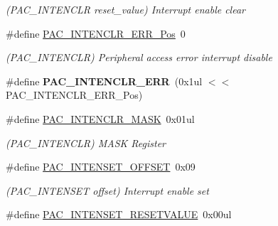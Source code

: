\begin{DoxyCompactItemize}
\begin{DoxyCompactList}\small\item\em (P\+A\+C\+\_\+\+I\+N\+T\+E\+N\+C\+L\+R reset\+\_\+value) Interrupt enable clear \end{DoxyCompactList}\item 
\hypertarget{group___s_a_m_l21___p_a_c_ga9d91633dd3124f58a42f16cbdf9bda28}{}\#define \hyperlink{group___s_a_m_l21___p_a_c_ga9d91633dd3124f58a42f16cbdf9bda28}{P\+A\+C\+\_\+\+I\+N\+T\+E\+N\+C\+L\+R\+\_\+\+E\+R\+R\+\_\+\+Pos}~0\label{group___s_a_m_l21___p_a_c_ga9d91633dd3124f58a42f16cbdf9bda28}

\begin{DoxyCompactList}\small\item\em (P\+A\+C\+\_\+\+I\+N\+T\+E\+N\+C\+L\+R) Peripheral access error interrupt disable \end{DoxyCompactList}\item 
\hypertarget{group___s_a_m_l21___p_a_c_ga0e138b449b32b5129e678be1f0547561}{}\#define {\bfseries P\+A\+C\+\_\+\+I\+N\+T\+E\+N\+C\+L\+R\+\_\+\+E\+R\+R}~(0x1ul $<$$<$ P\+A\+C\+\_\+\+I\+N\+T\+E\+N\+C\+L\+R\+\_\+\+E\+R\+R\+\_\+\+Pos)\label{group___s_a_m_l21___p_a_c_ga0e138b449b32b5129e678be1f0547561}

\item 
\hypertarget{group___s_a_m_l21___p_a_c_ga5d611adf6f1cc6376f50b18834e49b61}{}\#define \hyperlink{group___s_a_m_l21___p_a_c_ga5d611adf6f1cc6376f50b18834e49b61}{P\+A\+C\+\_\+\+I\+N\+T\+E\+N\+C\+L\+R\+\_\+\+M\+A\+S\+K}~0x01ul\label{group___s_a_m_l21___p_a_c_ga5d611adf6f1cc6376f50b18834e49b61}

\begin{DoxyCompactList}\small\item\em (P\+A\+C\+\_\+\+I\+N\+T\+E\+N\+C\+L\+R) M\+A\+S\+K Register \end{DoxyCompactList}\item 
\hypertarget{group___s_a_m_l21___p_a_c_ga421fbc8df3566dfcce8a684c5ae89aaa}{}\#define \hyperlink{group___s_a_m_l21___p_a_c_ga421fbc8df3566dfcce8a684c5ae89aaa}{P\+A\+C\+\_\+\+I\+N\+T\+E\+N\+S\+E\+T\+\_\+\+O\+F\+F\+S\+E\+T}~0x09\label{group___s_a_m_l21___p_a_c_ga421fbc8df3566dfcce8a684c5ae89aaa}

\begin{DoxyCompactList}\small\item\em (P\+A\+C\+\_\+\+I\+N\+T\+E\+N\+S\+E\+T offset) Interrupt enable set \end{DoxyCompactList}\item 
\hypertarget{group___s_a_m_l21___p_a_c_ga76af054cd69c5f88e62b0c70e9303e80}{}\#define \hyperlink{group___s_a_m_l21___p_a_c_ga76af054cd69c5f88e62b0c70e9303e80}{P\+A\+C\+\_\+\+I\+N\+T\+E\+N\+S\+E\+T\+\_\+\+R\+E\+S\+E\+T\+V\+A\+L\+U\+E}~0x00ul\label{group___s_a_m_l21___p_a_c_ga76af054cd69c5f88e62b0c70e9303e80}


\end{DoxyCompactItemize}
